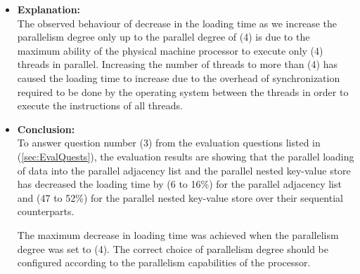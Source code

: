 {\begin{itemize}
On parallelism degree (1), both: the parallel adjacency list and the parallel nested key-value store recorded a loading time that is higher than the corresponding loading time of the sequential version.

In (\ref{fig:Parallel-Loading}), we show two graphs depicting the change in loading time of parallel adjacency list and parallel nested key-value store as an effect of the change in the parallelism degree of the parallel loader. In (Figure \ref{fig:Parallel-Loading-AdjLst}), we show a chart with the change in the loading time that corresponds to each degree of parallelism when loading the evaluation dataset with scale factor (1) into the parallel adjacency list and in (Figure \ref{fig:Parallel-Loading-NestedStore}), we show a similar chart for the change in the loading time of the parallel nested key-value store. In (\ref{tbl-EvalResults-Parallel-Loading}), we present a table containing the exact figures we recorded for each of the parallel loading experiments we executed on the parallel adjacency and the parallel nested key-value store.

\item \textbf{Explanation:}\\
The observed behaviour of decrease in the loading time as we increase the parallelism degree only up to the parallel degree of (4) is due to the maximum ability of the physical machine processor to execute only (4) threads in parallel. Increasing the number of threads to more than (4) has caused the loading time to increase due to the overhead of synchronization required to be done by the operating system between the threads in order to execute the instructions of all threads.

\item \textbf{Conclusion:}\\
To answer question number (3) from the evaluation questions listed in (\ref{sec:EvalQuests}), the evaluation results are showing that the parallel loading of data into the parallel adjacency list and the parallel nested key-value store has decreased the loading time by (6 to 16\%) for the parallel adjacency list and (47 to 52\%) for the parallel nested key-value store over their sequential counterparts. 

The maximum decrease in loading time was achieved when the parallelism degree was set to (4). The correct choice of parallelism degree should be configured according to the parallelism capabilities of the processor.

\end{itemize}


}
